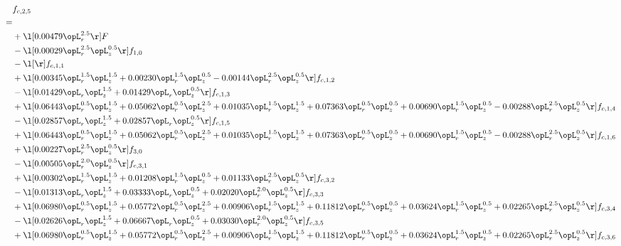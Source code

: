 \begin{alignat}{2} 
\label{eq:f_25_1} 
& f_{c,2,5} \nonumber \\ 
 = \\ 
& + \l[  0.00479 \opL_r^{2.5}  \r] F \nonumber \\ 
& - \l[  0.00029 \opL_r^{2.5} \opL_z^{0.5}  \r] f_{1,0} \nonumber \\ 
& - \l[  \r] f_{c,1,1} \nonumber \\ 
& + \l[  0.00345 \opL_r^{1.5} \opL_z^{1.5} +  0.00230 \opL_r^{1.5} \opL_z^{0.5}   -0.00144 \opL_r^{2.5} \opL_z^{0.5}  \r] f_{c,1,2} \nonumber \\ 
& - \l[  0.01429 \opL_r \opL_z^{1.5} +  0.01429 \opL_r \opL_z^{0.5}  \r] f_{c,1,3} \nonumber \\ 
& + \l[  0.06443 \opL_r^{0.5} \opL_z^{1.5} +  0.05062 \opL_r^{0.5} \opL_z^{2.5} +  0.01035 \opL_r^{1.5} \opL_z^{1.5} +  0.07363 \opL_r^{0.5} \opL_z^{0.5} +  0.00690 \opL_r^{1.5} \opL_z^{0.5}   -0.00288 \opL_r^{2.5} \opL_z^{0.5}  \r] f_{c,1,4} \nonumber \\ 
& - \l[  0.02857 \opL_r \opL_z^{1.5} +  0.02857 \opL_r \opL_z^{0.5}  \r] f_{c,1,5} \nonumber \\ 
& + \l[  0.06443 \opL_r^{0.5} \opL_z^{1.5} +  0.05062 \opL_r^{0.5} \opL_z^{2.5} +  0.01035 \opL_r^{1.5} \opL_z^{1.5} +  0.07363 \opL_r^{0.5} \opL_z^{0.5} +  0.00690 \opL_r^{1.5} \opL_z^{0.5}   -0.00288 \opL_r^{2.5} \opL_z^{0.5}  \r] f_{c,1,6} \nonumber \\ 
& + \l[  0.00227 \opL_r^{2.5} \opL_z^{0.5}  \r] f_{3,0} \nonumber \\ 
& - \l[  0.00505 \opL_r^{2.0} \opL_z^{0.5}  \r] f_{c,3,1} \nonumber \\ 
& + \l[  0.00302 \opL_r^{1.5} \opL_z^{1.5} +  0.01208 \opL_r^{1.5} \opL_z^{0.5} +  0.01133 \opL_r^{2.5} \opL_z^{0.5}  \r] f_{c,3,2} \nonumber \\ 
& - \l[  0.01313 \opL_r \opL_z^{1.5} +  0.03333 \opL_r \opL_z^{0.5} +  0.02020 \opL_r^{2.0} \opL_z^{0.5}  \r] f_{c,3,3} \nonumber \\ 
& + \l[  0.06980 \opL_r^{0.5} \opL_z^{1.5} +  0.05772 \opL_r^{0.5} \opL_z^{2.5} +  0.00906 \opL_r^{1.5} \opL_z^{1.5} +  0.11812 \opL_r^{0.5} \opL_z^{0.5} +  0.03624 \opL_r^{1.5} \opL_z^{0.5} +  0.02265 \opL_r^{2.5} \opL_z^{0.5}  \r] f_{c,3,4} \nonumber \\ 
& - \l[  0.02626 \opL_r \opL_z^{1.5} +  0.06667 \opL_r \opL_z^{0.5} +  0.03030 \opL_r^{2.0} \opL_z^{0.5}  \r] f_{c,3,5} \nonumber \\ 
& + \l[  0.06980 \opL_r^{0.5} \opL_z^{1.5} +  0.05772 \opL_r^{0.5} \opL_z^{2.5} +  0.00906 \opL_r^{1.5} \opL_z^{1.5} +  0.11812 \opL_r^{0.5} \opL_z^{0.5} +  0.03624 \opL_r^{1.5} \opL_z^{0.5} +  0.02265 \opL_r^{2.5} \opL_z^{0.5}  \r] f_{c,3,6} \nonumber \\ 

\end{alignat}
